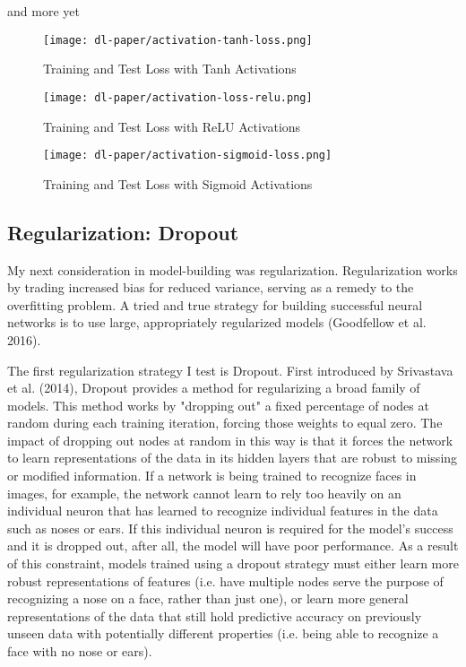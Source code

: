\documentclass[12pt]{article}  %
\theoremstyle{definition}
\theoremstyle{remark}
\begin{document}
\par and more yet 

\begin{figure}[!h]
  \texttt{[image: dl-paper/activation-tanh-loss.png]}
  \caption{Training and Test Loss with Tanh Activations}\label{tanh}
\endminipage\hfill
{}
  \texttt{[image: dl-paper/activation-loss-relu.png]}
  \caption{Training and Test Loss with ReLU Activations}\label{relu}
\endminipage\hfill
{}%
  \texttt{[image: dl-paper/activation-sigmoid-loss.png]}
  \caption{Training and Test Loss with Sigmoid Activations}\label{sigmoid}
\endminipage
\end{figure}


\subsection{Regularization: Dropout}
\par My next consideration in model-building was regularization. Regularization works by trading increased bias for reduced variance, serving as a remedy to the overfitting problem. A tried and true strategy for building successful neural networks is to use large, appropriately regularized models (Goodfellow et al. 2016). 
\par The first regularization strategy I test is Dropout. First introduced by Srivastava et al. (2014), Dropout provides a method for regularizing a broad family of models. This method works by "dropping out" a fixed percentage of nodes at random during each training iteration, forcing those weights to equal zero. The impact of dropping out nodes at random in this way is that it forces the network to learn representations of the data in its hidden layers that are robust to missing or modified information. If a network is being trained to recognize faces in images, for example, the network cannot learn to rely too heavily on an individual neuron that has learned to recognize individual features in the data such as noses or ears. If this individual neuron is required for the model's success and it is dropped out, after all, the model will have poor performance. As a result of this constraint, models trained using a dropout strategy must either learn more robust representations of features (i.e. have multiple nodes serve the purpose of recognizing a nose on a face, rather than just one), or learn more general representations of the data that still hold predictive accuracy on previously unseen data with potentially different properties (i.e. being able to recognize a face with no nose or ears).  
\end{document}
